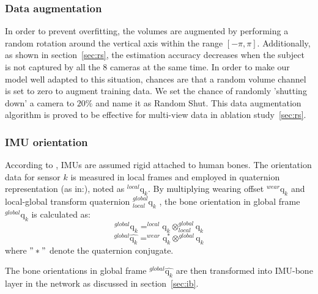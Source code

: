 \documentclass[10pt,twocolumn,letterpaper]{article}
\begin{document}
\subsubsection{Data augmentation}
In order to prevent overfitting, the volumes are augmented by performing a random rotation around the vertical axis within the range $[-\pi,\pi]$. Additionally, as shown in section~\ref{sec:rs}, the estimation accuracy decreases when the subject is not captured by all the 8 cameras at the same time. In order to make our model well adapted to this situation, chances are that a random volume channel is set to zero to augment training data. We set the chance of randomly 'shutting down' a camera to $20\%$ and name it as Random Shut. This data augmentation algorithm is proved to be effective for multi-view data in ablation study~\ref{sec:rs}.
\vspace{-0.3cm}
\subsubsection{IMU orientation}
According to \cite{trumble2017total}, IMUs are assumed rigid attached to human bones. The orientation data for sensor $k$ is measured in local frames and employed in quaternion representation (as in:\cite{gebre2004design,choukroun2003novel,bachmann1999orientation}), noted as $_{}^{local}\textrm{q}_{k}$. By multiplying wearing offset  $_{}^{wear}\textrm{q}_{k}$ and local-global transform quaternion $_{local}^{global}\textrm{q}_{k}$ , the bone orientation in global frame $_{}^{global}\textrm{q}_{k}$  is calculated as:
\begin{equation}
_{}^{global}\textrm{q}_{k} =   _{}^{local}\textrm{q}_{k} \otimes _{local}^{global}\textrm{q}_{k} 
\end{equation}
\begin{equation}
_{}^{global}\widehat{\textrm{q}_{k}} = _{}^{wear}\textrm{q}_{k}^{*} \otimes  _{}^{global}\textrm{q}_{k}
\end{equation}
where $"*"$ denote the quaternion conjugate.

The bone orientations in global frame $_{}^{global}\widehat{\textrm{q}_{k}}$ are then transformed into IMU-bone layer in the network as discussed in section~\ref{sec:ib}.
\end{document}
